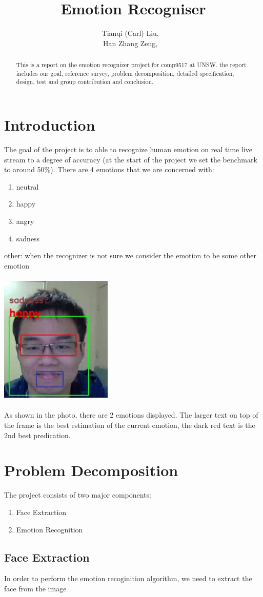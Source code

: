 \documentclass[11pt,journal]{IEEEtran}
\title{Emotion Recogniser}
\author{Tianqi (Carl) Liu, ~\IEEEmembership{z5019791} \\
        Han Zhang Zeng, ~\IEEEmembership{z12345678}}
\begin{document}
\maketitle
\begin{abstract}
    This is a report on the emotion recognizer project for comp9517 at UNSW. the report includes our goal, reference survey, problem decomposition, detailed specification, design, test and group contribution and conclusion.
\end{abstract}
\section{Introduction}
  The goal of the project is to able to recognize human emotion on real time live stream to a degree of accuracy (at the start of the project we set the benchmark to around 50\%). There are 4 emotions that we are concerned with:
  \begin{enumerate}
    \item neutral
    \item happy
    \item angry
    \item sadness
  \end{enumerate}
  other: when the recognizer is not sure we consider the emotion to be some other emotion\\\\
  \includegraphics[width=0.4\textwidth]{01.png} \\\\
  As shown in the photo, there are 2 emotions displayed. The larger text on top of the frame is the best estimation of the current emotion, the dark red text is the 2nd best predication.

\section{Problem Decomposition}
  The project consists of two major components:
  \begin{enumerate}
    \item Face Extraction
    \item Emotion Recognition
  \end{enumerate}

  \subsection{Face Extraction}
    In order to perform the emotion recoginition algorithm, we need to extract the face from the image
\end{document}
